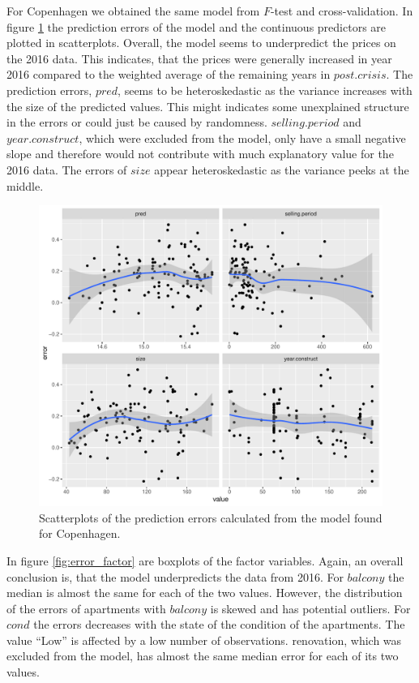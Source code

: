 For Copenhagen we obtained the same model from $F$-test and cross-validation.
In figure \ref{fig:error_cont} the prediction errors of the model and the continuous predictors are plotted in scatterplots. 
Overall, the model seems to underpredict the prices on the 2016 data. 
This indicates, that the prices were generally increased in year 2016 compared to the weighted average of the remaining years in $post.crisis$. 
The prediction errors, $pred$, seems to be heteroskedastic as the variance increases with the size of the predicted values. 
This might indicates some unexplained structure in the errors or could just be caused by randomness. 
$selling.period$ and $year.construct$, which were excluded from the model, only have a small negative slope and therefore would not contribute with much explanatory value for the 2016 data.
The errors of $size$ appear heteroskedastic as the variance peeks at the middle. 
\begin{figure}[H]
        \centering
      \includegraphics[width = 0.7 \textwidth]{figures/Nanna/errors_continuous.pdf}
      \caption{Scatterplots of the prediction errors calculated from the model found for Copenhagen. }
      \label{fig:error_cont}
\end{figure}
In figure \ref{fig:error_factor} are boxplots of the factor variables. 
Again, an overall conclusion is, that the model underpredicts the data from 2016.
For $balcony$ the median is almost the same for each of the two values.
However, the distribution of the errors of apartments with $balcony$ is skewed and has potential outliers. 
For $cond$ the errors decreases with the state of the condition of the apartments.
The value ``Low'' is affected by a low number of observations. 
renovation, which was excluded from the model, has almost the same median error for each of its two values. 
